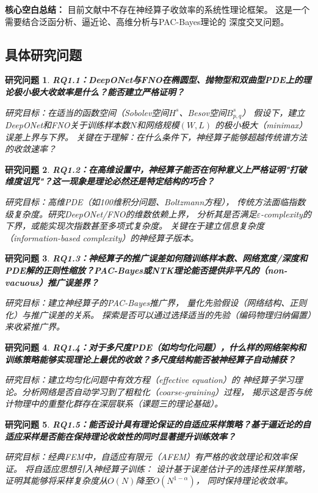 \documentclass[12pt,a4paper,twoside]{article}
\newtheorem{researchq}{研究问题}[section]
\begin{document}
\textbf{核心空白总结：}
目前文献中不存在神经算子收敛率的系统性理论框架。
这是一个需要结合泛函分析、逼近论、高维分析与PAC-Bayes理论的
深度交叉问题。

\subsection{具体研究问题}

\begin{researchq}
\textbf{RQ1.1：DeepONet与FNO在椭圆型、抛物型和双曲型PDE上的理论极小极大收敛率是什么？能否建立严格证明？}

研究目标：在适当的函数空间（Sobolev空间$H^s$、Besov空间$B^{s}_{p,q}$）
假设下，建立DeepONet和FNO关于训练样本数$N$和网络规模$(W,L)$
的极小极大（minimax）误差上界与下界。
关键在于理解：在什么条件下，神经算子能够超越传统谱方法的收敛速率？
\end{researchq}

\begin{researchq}
\textbf{RQ1.2：在高维设置中，神经算子能否在何种意义上严格证明"打破维度诅咒"？这一现象是理论必然还是特定结构的巧合？}

研究目标：高维PDE（如100维积分问题、Boltzmann方程），
传统方法面临指数级复杂度。研究DeepONet/FNO的维数依赖上界，
分析其是否满足$\varepsilon$-complexity的下界，或能实现次指数甚至多项式复杂度。
关键在于建立信息复杂度（information-based complexity）的神经算子版本。
\end{researchq}

\begin{researchq}
\textbf{RQ1.3：神经算子的推广误差如何随训练样本数、网络宽度/深度和PDE解的正则性缩放？PAC-Bayes或NTK理论能否提供非平凡的（non-vacuous）推广误差界？}

研究目标：建立神经算子的PAC-Bayes推广界，
量化先验假设（网络结构、正则化）与推广误差的关系。
探索是否可以通过选择适当的先验（编码物理归纳偏置）来收紧推广界。
\end{researchq}

\begin{researchq}
\textbf{RQ1.4：对于多尺度PDE（如均匀化问题），什么样的网络架构和训练策略能够实现理论上最优的收敛？多尺度结构能否被神经算子自动捕获？}

研究目标：建立均匀化问题中有效方程（effective equation）的
神经算子学习理论。分析网络是否自动学习到了粗粒化（coarse-graining）过程，
揭示这是否与统计物理中的重整化群存在深层联系（课题三的理论基础）。
\end{researchq}

\begin{researchq}
\textbf{RQ1.5：能否设计具有理论保证的自适应采样策略？基于逼近论的自适应采样是否能在保持理论收敛性的同时显著提升训练效率？}

研究目标：经典FEM中，自适应有限元（AFEM）有严格的收敛理论和效率保证。
将自适应思想引入神经算子训练：
设计基于误差估计子的选择性采样策略，
证明其能够将采样复杂度从$O(N)$降至$O(N^{1-\alpha})$，
同时保持理论收敛率。
\end{researchq}
\end{document}
